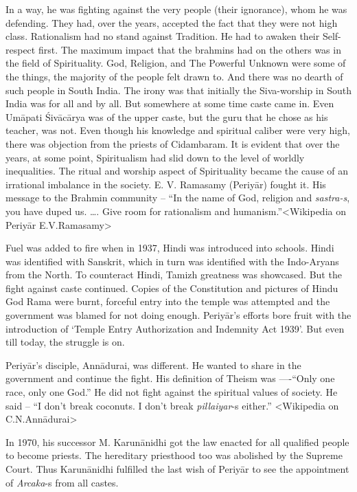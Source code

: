 In a way, he was fighting against the very people (their ignorance), whom he was defending. They had, over the years, accepted the fact that they were not high class. Rationalism had no stand against Tradition. He had to awaken their Self-respect first. The maximum impact that the brahmins had on the others was in the field of Spirituality. God, Religion, and The Powerful Unknown were some of the things, the majority of the people felt drawn to. And there was no dearth of such people in South India. The irony was that initially the Siva-worship in South India was for all and by all. But somewhere at some time caste came in. Even Umāpati Śivācārya was of the upper caste, but the guru that he chose as his teacher, was not. Even though his knowledge and spiritual caliber were very high, there was objection from the priests of Cidambaram. It is evident that over the years, at some point, Spiritualism had slid down to the level of worldly inequalities. The ritual and worship aspect of Spirituality became the cause of an irrational imbalance in the society. E. V. Ramasamy (Periyār) fought it. His message to the Brahmin community – “In the name of God, religion and \textit{sastra-s}, you have duped us. …. Give room for rationalism and humanism.”\textless Wikipedia on Periyār E.V.Ramasamy\textgreater 

Fuel was added to fire when in 1937, Hindi was introduced into schools. Hindi was identified with Sanskrit, which in turn was identified with the Indo-Aryans from the North. To counteract Hindi, Tamizh greatness was showcased. But the fight against caste continued. Copies of the Constitution and pictures of Hindu God Rama were burnt, forceful entry into the temple was attempted and the government was blamed for not doing enough. Periyār’s efforts bore fruit with the introduction of ‘Temple Entry Authorization and Indemnity Act 1939’. But even till today, the struggle is on.

Periyār’s disciple, Annādurai, was different. He wanted to share in the government and continue the fight. His definition of Theism was ----“Only one race, only one God.” He did not fight against the spiritual values of society. He said – “I don’t break coconuts. I don’t break \textit{pillaiyar}-s either.” \textless Wikipedia on C.N.Annādurai\textgreater 

In 1970, his successor M. Karunānidhi got the law enacted for all qualified people to become priests. The hereditary priesthood too was abolished by the Supreme Court. Thus Karunānidhi fulfilled the last wish of Periyār to see the appointment of \textit{Arcaka}-s from all castes.

